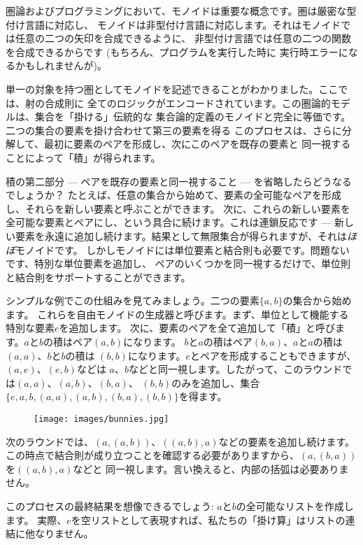 
\lettrine[lhang=0.17]{圏}{論}およびプログラミングにおいて、モノイドは重要な概念です。圏は厳密な型付け言語に対応し、
モノイドは非型付け言語に対応します。それはモノイドでは任意の二つの矢印を合成できるように、
非型付け言語では任意の二つの関数を合成できるからです (もちろん、プログラムを実行した時に
実行時エラーになるかもしれませんが)。

単一の対象を持つ圏としてモノイドを記述できることがわかりました。ここでは、射の合成則に
全てのロジックがエンコードされています。この圏論的モデルは、集合を「掛ける」伝統的な
集合論的定義のモノイドと完全に等価です。二つの集合の要素を掛け合わせて第三の要素を得る
このプロセスは、さらに分解して、最初に要素のペアを形成し、次にこのペアを既存の要素と
同一視することによって「積」が得られます。

積の第二部分  ---  ペアを既存の要素と同一視すること  ---  を省略したらどうなるでしょうか？
たとえば、任意の集合から始めて、要素の全可能なペアを形成し、それらを新しい要素と呼ぶことができます。
次に、これらの新しい要素を全可能な要素とペアにし、という具合に続けます。これは連鎖反応です  --- 
新しい要素を永遠に追加し続けます。結果として無限集合が得られますが、それは\emph{ほぼ}モノイドです。
しかしモノイドには単位要素と結合則も必要です。問題ないです、特別な単位要素を追加し、
ペアのいくつかを同一視するだけで、単位則と結合則をサポートすることができます。

シンプルな例でこの仕組みを見てみましょう。二つの要素$\{a, b\}$の集合から始めます。
これらを自由モノイドの生成器と呼びます。まず、単位として機能する特別な要素$e$を追加します。
次に、要素のペアを全て追加して「積」と呼びます。$a$と$b$の積はペア$(a, b)$になります。
$b$と$a$の積はペア$(b, a)$、$a$と$a$の積は$(a, a)$、$b$と$b$の積は
$(b, b)$になります。$e$とペアを形成することもできますが、$(a, e)$、$(e, b)$などは
$a$、$b$などと同一視します。したがって、このラウンドでは$(a, a)$、$(a, b)$、$(b, a)$、
$(b, b)$のみを追加し、集合$\{e, a, b, (a, a), (a, b), (b, a), (b, b)\}$を得ます。

\begin{figure}[H]
  \centering
  \texttt{[image: images/bunnies.jpg]}
\end{figure}

\noindent
次のラウンドでは、$(a, (a, b))$、$((a, b), a)$などの要素を追加し続けます。
この時点で結合則が成り立つことを確認する必要がありますから、$(a, (b, a))$を$((a, b), a)$などと
同一視します。言い換えると、内部の括弧は必要ありません。

このプロセスの最終結果を想像できるでしょう: $a$と$b$の全可能なリストを作成します。
実際、$e$を空リストとして表現すれば、私たちの「掛け算」はリストの連結に他なりません。

